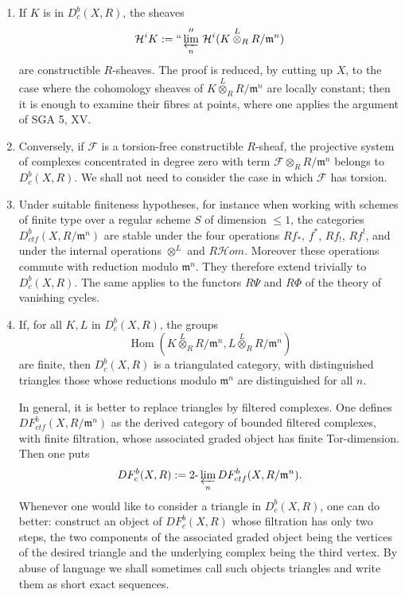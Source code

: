 \documentclass[11pt]{article}
\theoremstyle{remark}
\newcommand{\Hom}{\operatorname{Hom}}
\newcommand{\limproj}{\varprojlim}
\begin{document}
\begin{enumerate}[label=\alph*)]
\item If $K$ is in $D^b_c(X,R)$, the sheaves
\[
\mathcal H^iK := ``\limproj_n''\,\mathcal H^i(K\overset L\otimes_R R/\mathfrak m^n)
\]
are constructible $R$-sheaves. The proof is reduced, by cutting up $X$, to the case where the cohomology sheaves of $K\overset L\otimes_R R/\mathfrak m^n$ are locally constant; then it is enough to examine their fibres at points, where one applies the argument of SGA 5, XV.

\item Conversely, if $\mathcal F$ is a torsion-free constructible $R$-sheaf, the projective system of complexes concentrated in degree zero with term $\mathcal F\otimes_R R/\mathfrak m^n$ belongs to $D^b_c(X,R)$. We shall not need to consider the case in which $\mathcal F$ has torsion.

\item Under suitable finiteness hypotheses, for instance when working with schemes of finite type over a regular scheme $S$ of dimension $\le1$, the categories $D^b_{ctf}(X,R/\mathfrak m^n)$ are stable under the four operations $Rf_*$, $f^*$, $Rf_!$, $Rf^!$, and under the internal operations $\otimes^L$ and $R\mathcal Hom$. Moreover these operations commute with reduction modulo $\mathfrak m^n$. They therefore extend trivially to $D^b_c(X,R)$. The same applies to the functors $R\Psi$ and $R\Phi$ of the theory of vanishing cycles.

\item If, for all $K,L$ in $D^b_c(X,R)$, the groups
\[
\Hom(K\overset L\otimes_R R/\mathfrak m^n,
     L\overset L\otimes_R R/\mathfrak m^n)
\]
are finite, then $D^b_c(X,R)$ is a triangulated category, with distinguished triangles those whose reductions modulo $\mathfrak m^n$ are distinguished for all $n$.

In general, it is better to replace triangles by filtered complexes. One defines $DF^b_{ctf}(X,R/\mathfrak m^n)$ as the derived category of bounded filtered complexes, with finite filtration, whose associated graded object has finite Tor-dimension. Then one puts
\[
DF^b_c(X,R):=2\text{-}\limproj_n DF^b_{ctf}(X,R/\mathfrak m^n).
\]
Whenever one would like to consider a triangle in $D^b_c(X,R)$, one can do better: construct an object of $DF^b_c(X,R)$ whose filtration has only two steps, the two components of the associated graded object being the vertices of the desired triangle and the underlying complex being the third vertex. By abuse of language we shall sometimes call such objects triangles and write them as short exact sequences.


\end{enumerate}
\end{document}
